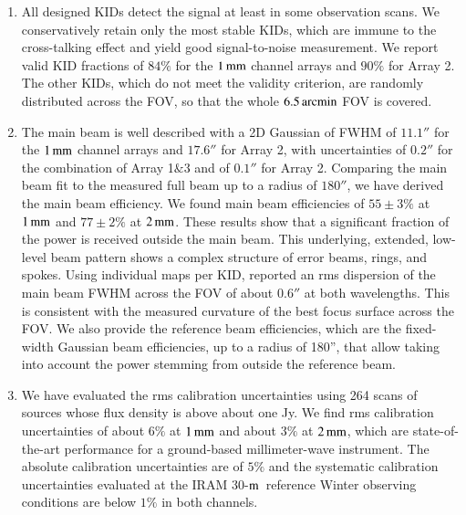 \documentclass[traditionalabstract]{aa}
\newcommand{\trentemetre}{30-$\rm{m}$}
\newcommand{\lp}[1]{#1}
\begin{document}
\begin{enumerate}
\item %
  All designed KIDs detect the
  signal at least in some observation
  scans. We conservatively retain only the most stable KIDs, which are
  immune to the cross-talking effect and yield good signal-to-noise
  measurement. 
  We report valid KID fractions of $84\%$
  for the $1\,\rm{mm}$ channel arrays and $90\%$ for Array 2. The other
  KIDs, which do not meet the validity criterion, are randomly
  distributed across the FOV, so that the whole $6.5\,\rm{arcmin}$ FOV is
  covered.
  \vspace{1mm}
\item %
  The main beam is well described with a 2D
  Gaussian of FWHM of $11.1''$ for the $1\,\rm{mm}$ channel arrays
  and $17.6''$ for Array 2, with uncertainties of $0.2''$ for the
  combination of Array 1$\&$3 and of $0.1''$ for Array 2.
  Comparing the main beam fit to the measured full beam up to a radius of $180''$, we have derived the
  main beam efficiency. We found main beam
  efficiencies of $55 \pm 3 \%$ at $1\,\rm{mm}$ and $77 \pm 2 \%$ at
  $2\,\rm{mm}$.
  {\lp These results show that a significant fraction of the power is received
    outside the main beam. This underlying,
    extended, low-level beam pattern shows a complex structure of error 
    beams, rings, and spokes.}
  Using individual maps per KID, \citet{Adam2018} reported an rms
  dispersion of the main beam FWHM across the FOV of about $0.6''$ at
  both wavelengths. This is consistent with the measured curvature of
  the best focus surface across the FOV. 
  {\lp We also provide the reference beam efficiencies, which are the
    fixed-width Gaussian beam efficiencies, up to a radius
    of 180'', that allow taking into account the power stemming from
    outside the reference beam.} 
  \vspace{1mm}
\item %
  We have evaluated the rms calibration uncertainties using 264 
  scans of sources whose flux density is above about one Jy. We find rms calibration
  uncertainties of about $6\%$ at $1\,\rm{mm}$ and about $3\%$ at
  $2\,\rm{mm}$, which are state-of-the-art performance for a
  ground-based millimeter-wave instrument. The absolute
  calibration uncertainties are of $5\%$ and the systematic
  calibration uncertainties evaluated at the IRAM
  \trentemetre\ reference Winter observing conditions are
  below $1\%$ in both channels.
   \vspace{1mm}

\end{enumerate}
\end{document}
